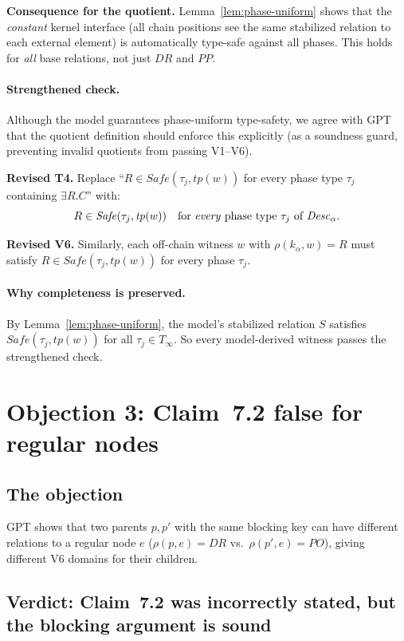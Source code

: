 \documentclass[11pt]{article}
\newcommand{\DR}{\mathit{DR}}
\newcommand{\PO}{\mathit{PO}}
\newcommand{\PP}{\mathit{PP}}
\newcommand{\tp}{\mathit{tp}}
\newcommand{\Desc}{\mathit{Desc}}
\newcommand{\Safe}{\mathit{Safe}}
\theoremstyle{definition}
\begin{document}
\noindent\textbf{Consequence for the quotient.}\;
Lemma~\ref{lem:phase-uniform} shows that the \emph{constant}
kernel interface (all chain positions see the same stabilized
relation to each external element) is automatically type-safe
against all phases.  This holds for \emph{all} base relations,
not just $\DR$ and $\PP$.

\paragraph{Strengthened check.}
Although the model guarantees phase-uniform type-safety, we
agree with GPT that the quotient definition should enforce this
explicitly (as a soundness guard, preventing invalid quotients
from passing V1--V6).

\medskip\noindent\textbf{Revised T4.}\;  Replace
``$R \in \Safe(\tau_j, \tp(w))$ for every phase type $\tau_j$
containing $\exists R.C$'' with:
\[
R \in \Safe(\tau_j, \tp(w)) \quad\text{for \emph{every} phase
type $\tau_j$ of $\Desc_\alpha$}.
\]

\noindent\textbf{Revised V6.}\; Similarly, each off-chain
witness $w$ with $\rho(k_\alpha, w) = R$ must satisfy
$R \in \Safe(\tau_j, \tp(w))$ for every phase $\tau_j$.

\paragraph{Why completeness is preserved.}
By Lemma~\ref{lem:phase-uniform}, the model's stabilized
relation $S$ satisfies $\Safe(\tau_j, \tp(w))$ for all
$\tau_j \in T_\infty$.  So every model-derived witness passes
the strengthened check.

\section{Objection 3: Claim~7.2 false for regular nodes}

\subsection{The objection}

GPT shows that two parents $p, p'$ with the same blocking key
can have different relations to a regular node $e$
($\rho(p, e) = \DR$ vs.\ $\rho(p', e) = \PO$), giving
different V6 domains for their children.

\subsection{Verdict: Claim~7.2 was incorrectly stated, but the
blocking argument is sound}
\end{document}
